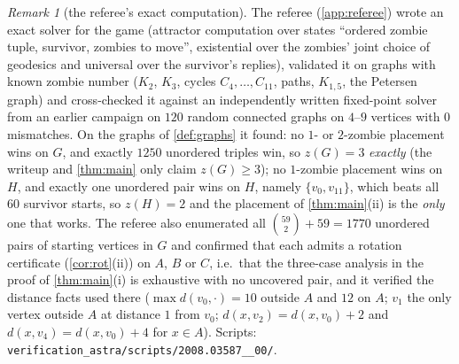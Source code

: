 \documentclass[11pt,a4paper]{article}
\theoremstyle{plain}
\theoremstyle{definition}
\theoremstyle{remark}
\newtheorem{remark}[theorem]{Remark}
\newcommand{\dist}{d}
\begin{document}
\begin{remark}[the referee's exact computation]\label{rem:computation}
The referee (\cref{app:referee}) wrote an exact solver for the game (attractor computation over states ``ordered zombie tuple, survivor, zombies to move'', existential over the zombies' joint choice of geodesics and universal over the survivor's replies), validated it on graphs with known zombie number ($K_2$, $K_3$, cycles $C_4,\dots,C_{11}$, paths, $K_{1,5}$, the Petersen graph) and cross-checked it against an independently written fixed-point solver from an earlier campaign on $120$ random connected graphs on $4$--$9$ vertices with $0$ mismatches. On the graphs of \cref{def:graphs} it found: no $1$- or $2$-zombie placement wins on $G$, and exactly $1250$ unordered triples win, so $z(G)=3$ \emph{exactly} (the writeup and \cref{thm:main} only claim $z(G)\ge3$); no $1$-zombie placement wins on $H$, and exactly one unordered pair wins on $H$, namely $\{v_0,v_{11}\}$, which beats all $60$ survivor starts, so $z(H)=2$ and the placement of \cref{thm:main}(ii) is the \emph{only} one that works. The referee also enumerated all $\binom{59}{2}+59=1770$ unordered pairs of starting vertices in $G$ and confirmed that each admits a rotation certificate (\cref{cor:rot}(ii)) on $A$, $B$ or $C$, i.e.\ that the three-case analysis in the proof of \cref{thm:main}(i) is exhaustive with no uncovered pair, and it verified the distance facts used there ($\max\dist(v_0,\cdot)=10$ outside $A$ and $12$ on $A$; $v_1$ the only vertex outside $A$ at distance $1$ from $v_0$; $\dist(x,v_2)=\dist(x,v_0)+2$ and $\dist(x,v_4)=\dist(x,v_0)+4$ for $x\in A$). Scripts: \texttt{verification\_astra/scripts/2008.03587\_\_00/}.
\end{remark}
\end{document}
